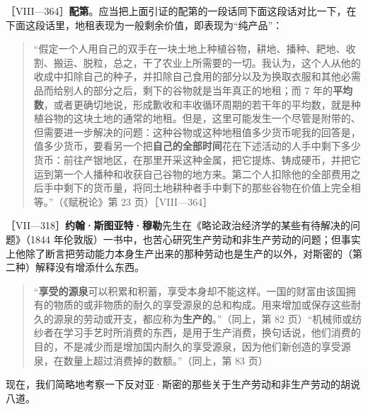 
［VIII—364］\fontbox{~\{}\textbf{配第}。应当把上面引证的配第的一段话同下面这段话对比一下，在下面这段话里，地租表现为一般剩余价值，即表现为“纯产品”：

\begin{quote}“假定一个人用自己的双手在一块土地上种植谷物，耕地、播种、耙地、收割、搬运、脱粒，总之，干了农业上所需要的一切。我认为，这个人从他的收成中扣除自己的种子，并扣除自己食用的部分以及为换取衣服和其他必需品而给别人的部分之后，剩下的谷物就是当年真正的地租；而 7 年的\textbf{平均数}，或者更确切地说，形成歉收和丰收循环周期的若干年的平均数，就是种植谷物的这块土地的通常的地租。但是，这里可能发生一个尽管是附带的、但需要进一步解决的问题：这种谷物或这种地租值多少货币呢我的回答是，值多少货币，要看另一个把\textbf{自己的全部时间}花在下述活动的人手中剩下多少货币：前往产银地区，在那里开采这种金属，把它提炼、铸成硬币，并把它运到第一个人播种和收获自己谷物的地方来。第二个人扣除他的全部费用之后手中剩下的货币量，将同土地耕种者手中剩下的那些谷物在价值上完全相等。”（《赋税论》第 23 页）\fontbox{\}~}［VIII—364］\end{quote}


［VII—318］\textbf{约翰·斯图亚特·穆勒}先生在《略论政治经济学的某些有待解决的问题》（1844 年伦敦版）一书中，也苦心研究生产劳动和非生产劳动的问题；但事实上他除了断言把劳动能力本身生产出来的那种劳动也是生产的以外，对斯密的（第二种）解释没有增添什么东西。

\begin{quote}“\textbf{享受的源泉}可以积累和积蓄，享受本身却不能这样。一国的财富由该国拥有的物质的或非物质的耐久的享受源泉的总和构成。用来增加或保存这些耐久的源泉的劳动或开支，都应称为\textbf{生产的}。”（同上，第 82 页）“机械师或纺纱者在学习手艺时所消费的东西，是用于生产消费，换句话说，他们消费的目的，不是减少而是增加国内耐久的享受源泉，因为他们新创造的享受源泉，在数量上超过消费掉的数额。”（同上，第 83 页）\end{quote}


现在，我们简略地考察一下反对亚·斯密的那些关于生产劳动和非生产劳动的胡说八道。

